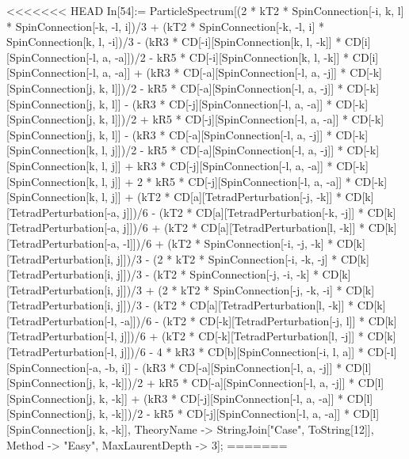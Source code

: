 <<<<<<< HEAD
In[54]:= ParticleSpectrum[(2 * kT2 * SpinConnection[-i, k, l] * SpinConnection[-k, -l, i])/3 + (kT2 * SpinConnection[-k, -l, i] * SpinConnection[k, l, -i])/3 - (kR3 * CD[-i][SpinConnection[k, l, -k]] * CD[i][SpinConnection[-l, a, -a]])/2 - kR5 * CD[-i][SpinConnection[k, l, -k]] * CD[i][SpinConnection[-l, a, -a]] + (kR3 * CD[-a][SpinConnection[-l, a, -j]] * CD[-k][SpinConnection[j, k, l]])/2 - kR5 * CD[-a][SpinConnection[-l, a, -j]] * CD[-k][SpinConnection[j, k, l]] - (kR3 * CD[-j][SpinConnection[-l, a, -a]] * CD[-k][SpinConnection[j, k, l]])/2 + kR5 * CD[-j][SpinConnection[-l, a, -a]] * CD[-k][SpinConnection[j, k, l]] - (kR3 * CD[-a][SpinConnection[-l, a, -j]] * CD[-k][SpinConnection[k, l, j]])/2 - kR5 * CD[-a][SpinConnection[-l, a, -j]] * CD[-k][SpinConnection[k, l, j]] + kR3 * CD[-j][SpinConnection[-l, a, -a]] * CD[-k][SpinConnection[k, l, j]] + 2 * kR5 * CD[-j][SpinConnection[-l, a, -a]] * CD[-k][SpinConnection[k, l, j]] + (kT2 * CD[a][TetradPerturbation[-j, -k]] * CD[k][TetradPerturbation[-a, j]])/6 - (kT2 * CD[a][TetradPerturbation[-k, -j]] * CD[k][TetradPerturbation[-a, j]])/6 + (kT2 * CD[a][TetradPerturbation[l, -k]] * CD[k][TetradPerturbation[-a, -l]])/6 + (kT2 * SpinConnection[-i, -j, -k] * CD[k][TetradPerturbation[i, j]])/3 - (2 * kT2 * SpinConnection[-i, -k, -j] * CD[k][TetradPerturbation[i, j]])/3 - (kT2 * SpinConnection[-j, -i, -k] * CD[k][TetradPerturbation[i, j]])/3 + (2 * kT2 * SpinConnection[-j, -k, -i] * CD[k][TetradPerturbation[i, j]])/3 - (kT2 * CD[a][TetradPerturbation[l, -k]] * CD[k][TetradPerturbation[-l, -a]])/6 - (kT2 * CD[-k][TetradPerturbation[-j, l]] * CD[k][TetradPerturbation[-l, j]])/6 + (kT2 * CD[-k][TetradPerturbation[l, -j]] * CD[k][TetradPerturbation[-l, j]])/6 - 4 * kR3 * CD[b][SpinConnection[-i, l, a]] * CD[-l][SpinConnection[-a, -b, i]] - (kR3 * CD[-a][SpinConnection[-l, a, -j]] * CD[l][SpinConnection[j, k, -k]])/2 + kR5 * CD[-a][SpinConnection[-l, a, -j]] * CD[l][SpinConnection[j, k, -k]] + (kR3 * CD[-j][SpinConnection[-l, a, -a]] * CD[l][SpinConnection[j, k, -k]])/2 - kR5 * CD[-j][SpinConnection[-l, a, -a]] * CD[l][SpinConnection[j, k, -k]], TheoryName -> StringJoin["Case", ToString[12]], Method -> "Easy", MaxLaurentDepth -> 3]; 
=======
